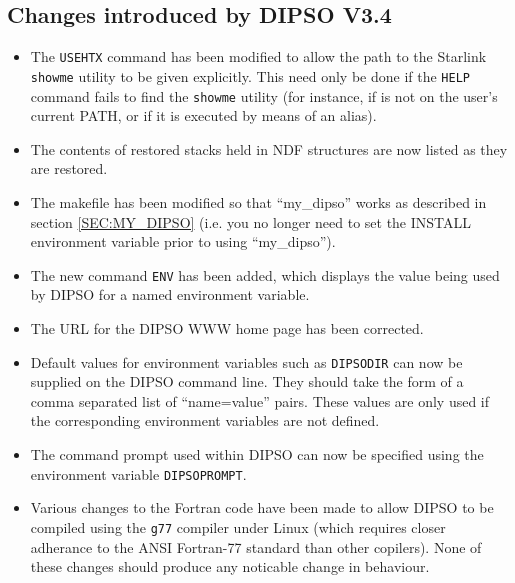 \subsection{Changes introduced by DIPSO V3.4}
\begin{itemize}

\item The {\tt USEHTX} command has been modified to allow the path to the
Starlink {\tt showme} utility to be given explicitly. This need only be done 
if the {\tt HELP} command fails to find the {\tt showme} utility (for
instance, if is not on the user's current PATH, or if it is
executed by means of an alias). 

\item The contents of restored stacks held in NDF structures are now
listed as they are restored.

\item The makefile has been modified so that ``my\_dipso'' works as
described in section \ref{SEC:MY_DIPSO} (i.e. you no longer need to
set the INSTALL environment variable prior to using ``my\_dipso'').

\item The new command {\tt ENV} has been added, which displays the value
being used by DIPSO for a named environment variable.

\item The URL for the DIPSO WWW home page has been corrected.

\item Default values for environment variables such as \verb+DIPSODIR+ can
now be supplied on the DIPSO command line. They should take the form of a
comma separated list of ``name=value'' pairs. These values are only used
if the corresponding environment variables are not defined.

\item The command prompt used within DIPSO can now be specified using the 
environment variable \verb+DIPSOPROMPT+.

\item Various changes to the Fortran code have been made to allow DIPSO
to be compiled using the \verb+g77+ compiler under Linux (which requires
closer adherance to the ANSI Fortran-77 standard than other copilers).
None of these changes should produce any noticable change in behaviour.

\end{itemize}

